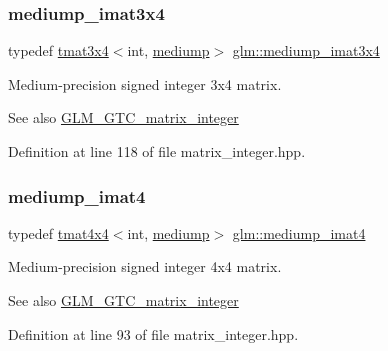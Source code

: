 \subsubsection{\texorpdfstring{mediump\_imat3x4}{mediump\_imat3x4}}
{\footnotesize\ttfamily typedef \mbox{\hyperlink{structglm_1_1tmat3x4}{tmat3x4}}$<$int, \mbox{\hyperlink{namespaceglm_a0f04f086094c747d227af4425893f545a6416f3ea0c9025fb21ed50c4d6620482}{mediump}}$>$ \mbox{\hyperlink{group__gtc__matrix__integer_ga721a754fc35cc5ac097e331d893a6b2c}{glm\+::mediump\+\_\+imat3x4}}}

Medium-\/precision signed integer 3x4 matrix. \begin{DoxySeeAlso}{See also}
\mbox{\hyperlink{group__gtc__matrix__integer}{G\+L\+M\+\_\+\+G\+T\+C\+\_\+matrix\+\_\+integer}} 
\end{DoxySeeAlso}


Definition at line 118 of file matrix\+\_\+integer.\+hpp.

\mbox{\label{group__gtc__matrix__integer_ga680c97868de08658ca4924718d951def}} 
\subsubsection{\texorpdfstring{mediump\_imat4}{mediump\_imat4}}
{\footnotesize\ttfamily typedef \mbox{\hyperlink{structglm_1_1tmat4x4}{tmat4x4}}$<$int, \mbox{\hyperlink{namespaceglm_a0f04f086094c747d227af4425893f545a6416f3ea0c9025fb21ed50c4d6620482}{mediump}}$>$ \mbox{\hyperlink{group__gtc__matrix__integer_ga680c97868de08658ca4924718d951def}{glm\+::mediump\+\_\+imat4}}}

Medium-\/precision signed integer 4x4 matrix. \begin{DoxySeeAlso}{See also}
\mbox{\hyperlink{group__gtc__matrix__integer}{G\+L\+M\+\_\+\+G\+T\+C\+\_\+matrix\+\_\+integer}} 
\end{DoxySeeAlso}


Definition at line 93 of file matrix\+\_\+integer.\+hpp.

\mbox{\label{group__gtc__matrix__integer_gabfe107153637dfd7a0c272ff1ba892ed}} 
